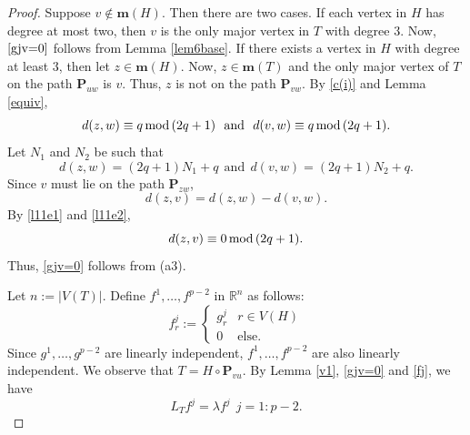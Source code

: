 \documentclass[preprint,12pt]{elsarticle}
\newcommand{\rr}{\mathbb{R}}
\newcommand{\1}{\mathbf{1}}
\newcommand{\0}{\mathbf{0}}
\newcommand{\p}{{\mathbf{P}}}
\def\m{\mathbf{m}}
\def\p{\mathbf{P}}
\begin{document}
\begin{proof}
Suppose $v\notin \m(H)$. Then there are two cases.
If each vertex in $H$ has degree at most two, then $v$
is the only major vertex in $T$ with degree $3$. 
Now, $\eqref{gjv=0}$ follows from Lemma \ref{lem6base}. 
If there exists a vertex in $H$ with degree at least $3$,
then let $z \in \m(H)$. 
Now, $z \in \m(T)$ and the only major vertex of $T$ on the path $\p_{uw}$ is $v$. Thus, $z$ is not on the path $\p_{vw}$.  
By \eqref{c(i)} and Lemma \ref{equiv},
\begin{equation*}
 d(z,w)\equiv q\,{\rm{mod}}\,(2q+1)~~\text{and}~~d(v,w)\equiv q\,{\rm{mod}}\,(2q+1).   
\end{equation*}
Let $N_1$ and $N_2$ be such that
\begin{equation}\label{l11e1}
    d(z,w)=(2q+1)N_1+q~~\text{and}~~d(v,w)=(2q+1)N_2+q.
\end{equation}
Since $v$ must lie on the path $\p_{zw}$,
\begin{equation}\label{l11e2}
d(z,v)=d(z,w)-d(v,w).    
\end{equation}
By \eqref{l11e1} and \eqref{l11e2},
\begin{equation}\label{distvm}
    d(z,v)\equiv 0\,{\rm{mod}}\,(2q+1).
\end{equation}
Thus, \eqref{gjv=0} follows from (a3).

Let $n:=|V(T)|$.
Define $f^1,\dotsc,f^{p-2}$ in $\rr^n$ as follows:
\begin{equation}\label{fj}
f^j_r:=
\begin{cases}
g^j_r & r\in V(H) \\
0 & \mbox{else.}
\end{cases}    
\end{equation}
Since $g^1,\dots,g^{p-2}$ are linearly independent, $f^1,\dots,f^{p-2}$ are also linearly independent.
We observe that
$T=H \circ \p_{vu}$.
By Lemma \ref{v1}, \eqref{gjv=0} and \eqref{fj}, we have
\[L_T f^j=\lambda f^j~~j=1:p-2.\]



\end{proof}
\end{document}
